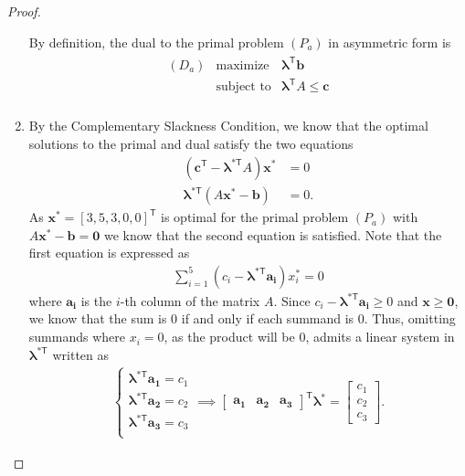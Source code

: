 \documentclass[12pt]{article}
\theoremstyle{definition}
\newcommand{\vc}[1]{\boldsymbol{#1}}
\newcommand{\tran}{\mathsf{T}}
\begin{document}
\begin{proof}
\begin{enumerate}
      By definition, the dual to the primal problem $(P_a)$ in asymmetric form
      is
      \begin{align*}
        \begin{array}{rrl}
          (D_a) & \text{maximize} & \vc{\lambda}^\tran\vc{b} \\
          & \text{subject to} & \vc{\lambda}^\tran A \leq \vc{c}  \\
        \end{array}
      \end{align*}
    \item By the Complementary Slackness Condition, we know that the optimal solutions
      to the primal and dual satisfy the two equations
      \begin{align*}
        (\vc{c}^\tran - \vc{\lambda}^{*\tran} A)\vc{x}^{*} &= 0 \\
        \vc{\lambda}^{*\tran}(A\vc{x}^{*} - \vc{b}) &= 0.
      \end{align*}
      As $\vc{x}^{*} = [3,5,3,0,0]^\tran$ is optimal for the primal problem $(P_a)$ with $A\vc{x}^{*} - \vc{b} = \vc{0}$
      we know that the second equation is satisfied. Note that the first equation is expressed as
      \begin{align*}
        \sum_{i=1}^5 (c_i -\vc{\lambda}^{*\tran} \vc{a_i}) x_i^{*} = 0
      \end{align*}
      where $\vc{a_i}$ is the $i$-th column of the matrix $A$.
      Since $c_i -\vc{\lambda}^{*\tran} \vc{a_i} \geq 0$ and $\vc{x} \geq \vc{0}$,
      we know that the sum is 0 if and only if each summand is 0. Thus, omitting summands where $x_i = 0$, as the product will be 0,
      admits a linear system in $\vc{\lambda}^{*\tran}$ written as
      \begin{align*}
        \begin{cases}
          \vc{\lambda}^{*\tran}\vc{a_1} = c_1 \\
          \vc{\lambda}^{*\tran}\vc{a_2} = c_2 \\
          \vc{\lambda}^{*\tran}\vc{a_3} = c_3 \\
        \end{cases}
        \implies
        \begin{bmatrix}\vc{a_1} & \vc{a_2} & \vc{a_3}\end{bmatrix}^\tran \vc{\lambda}^{*} = \begin{bmatrix}c_1 \\ c_2 \\ c_3\end{bmatrix}.

\end{align*}
\end{enumerate}
\end{proof}
\end{document}
